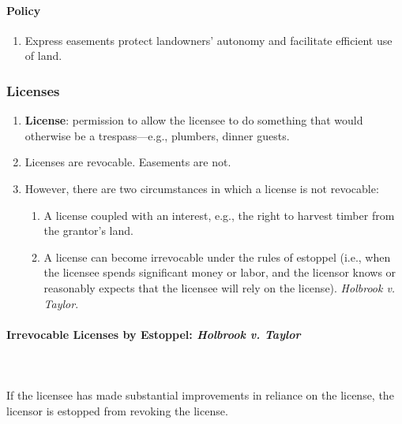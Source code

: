 \paragraph{Policy}

\begin{enumerate}
    \item Express easements protect landowners' autonomy and facilitate 
    efficient use of land. 
\end{enumerate}

\subsubsection{Licenses}

\begin{enumerate}
    \item \textbf{License}: permission to allow the licensee to do something 
    that would otherwise be a trespass---e.g., plumbers, dinner guests.
    \item Licenses are revocable. Easements are not.
    \item However, there are two circumstances in which a license is not 
    revocable:
    \begin{enumerate}
        \item A license coupled with an interest, e.g., the right to harvest 
        timber from the grantor's land.
        \item A license can become irrevocable under the rules of estoppel 
        (i.e., when the licensee spends significant money or labor, and the 
        licensor knows or reasonably expects that the licensee will rely on 
        the license). \emph{Holbrook v. Taylor}.
    \end{enumerate}
\end{enumerate}

\paragraph{Irrevocable Licenses by Estoppel: \emph{Holbrook v. Taylor}}
~\\\\
If the licensee has made substantial improvements in reliance on the license, 
the licensor is estopped from revoking the license.

